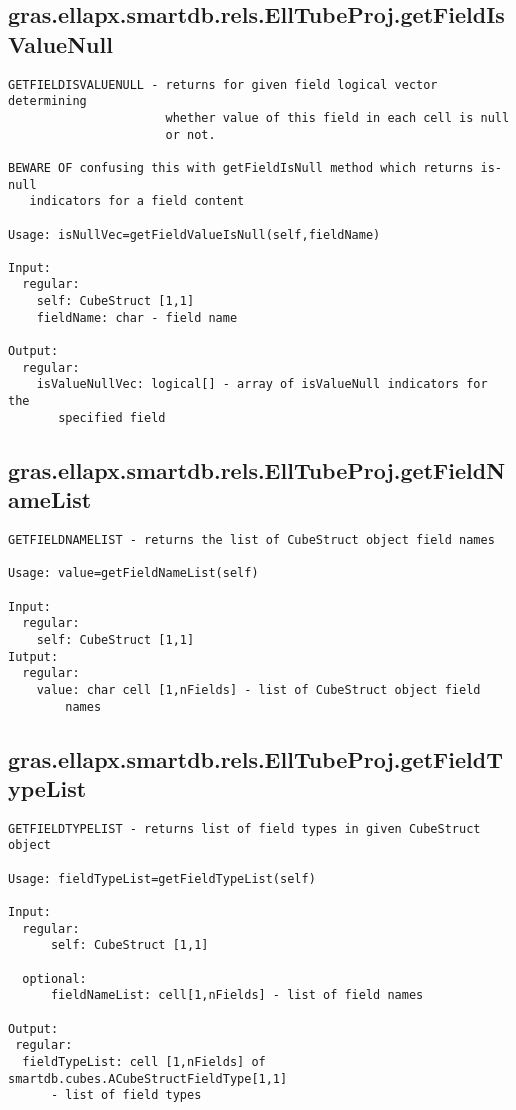 \subsection{\texorpdfstring{gras.ellapx.smartdb.rels.EllTubeProj.getFieldIsValueNull}{getFieldIsValueNull}}\label{method:gras.ellapx.smartdb.rels.EllTubeProj.getFieldIsValueNull}
\begin{verbatim}
GETFIELDISVALUENULL - returns for given field logical vector determining
                      whether value of this field in each cell is null
                      or not.

BEWARE OF confusing this with getFieldIsNull method which returns is-null
   indicators for a field content

Usage: isNullVec=getFieldValueIsNull(self,fieldName)

Input:
  regular:
    self: CubeStruct [1,1]
    fieldName: char - field name

Output:
  regular:
    isValueNullVec: logical[] - array of isValueNull indicators for the
       specified field
\end{verbatim}
\subsection{\texorpdfstring{gras.ellapx.smartdb.rels.EllTubeProj.getFieldNameList}{getFieldNameList}}\label{method:gras.ellapx.smartdb.rels.EllTubeProj.getFieldNameList}
\begin{verbatim}
GETFIELDNAMELIST - returns the list of CubeStruct object field names

Usage: value=getFieldNameList(self)

Input:
  regular:
    self: CubeStruct [1,1]
Iutput:
  regular:
    value: char cell [1,nFields] - list of CubeStruct object field
        names
\end{verbatim}
\subsection{\texorpdfstring{gras.ellapx.smartdb.rels.EllTubeProj.getFieldTypeList}{getFieldTypeList}}\label{method:gras.ellapx.smartdb.rels.EllTubeProj.getFieldTypeList}
\begin{verbatim}
GETFIELDTYPELIST - returns list of field types in given CubeStruct object

Usage: fieldTypeList=getFieldTypeList(self)

Input:
  regular:
      self: CubeStruct [1,1]

  optional:
      fieldNameList: cell[1,nFields] - list of field names

Output:
 regular:
  fieldTypeList: cell [1,nFields] of smartdb.cubes.ACubeStructFieldType[1,1]
      - list of field types
\end{verbatim}
